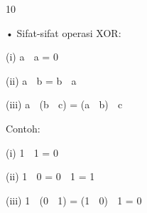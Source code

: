 \documentclass{article}
\begin{document}

10

• Sifat-sifat operasi XOR:

 (i)   a   a = 0 





 (ii)  a  b = b  a 

 (iii) a  (b  c) = (a  b)  c  

  Contoh: 

   (i)  1   1 = 0

   (ii) 1   0 = 0   1 = 1

   (iii) 1  (0  1) = (1  0)  1 = 0
\end{document}
